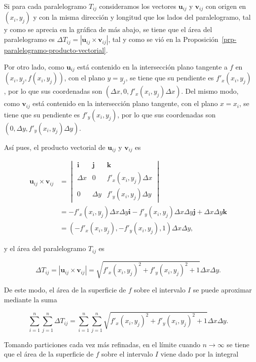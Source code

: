 \documentclass[
  a4paper,
]{scrreport}
\theoremstyle{definition}
\theoremstyle{definition}
\theoremstyle{definition}
\theoremstyle{plain}
\theoremstyle{plain}
\theoremstyle{plain}
\theoremstyle{remark}
\begin{document}
Si para cada paralelogramo \(T_{ij}\) consideramos los vectores
\(\mathbf{u}_{ij}\) y \(\mathbf{v}_{ij}\) con origen en \((x_i, y_j)\) y
con la misma dirección y longitud que los lados del paralelogramo, tal y
como se aprecia en la gráfica de más abajo, se tiene que el área del
paralelogramo es
\(\Delta T_{ij} = |\mathbf{u}_{ij}\times\mathbf{v}_{ij}|\), tal y como
se vió en la Proposición~\ref{prp-paralelogramo-producto-vectorial}.

Por otro lado, como \(\mathbf{u}_{ij}\) está contenido en la
intersección plano tangente a \(f\) en \((x_i,y_j,f(x_i,y_j))\), con el
plano \(y=y_j\), se tiene que su pendiente es \(f'_x(x_i,y_j)\), por lo
que sus coordenadas son \((\Delta x, 0, f'_x(x_i,y_j)\Delta x)\). Del
mismo modo, como \(\mathbf{v}_{ij}\) está contenido en la intersección
plano tangente, con el plano \(x=x_i\), se tiene que su pendiente es
\(f'_y(x_i,y_j)\), por lo que sus coordenadas son
\((0, \Delta y, f'_y(x_i,y_j)\Delta y)\).

Así pues, el producto vectorial de \(\mathbf{u}_{ij}\) y
\(\mathbf{v}_{ij}\) es

\begin{align*}
\mathbf{u}_{ij}\times\mathbf{v}_{ij} 
&= 
\begin{vmatrix}
\mathbf{i} & \mathbf{j} & \mathbf{k} \\
\Delta x & 0 & f'_x(x_i,y_j)\Delta x \\
0 & \Delta y & f'_y(x_i,y_j)\Delta y
\end{vmatrix} \\
&= -f'_x(x_i,y_j)\Delta x\Delta y \mathbf{i} -f'_y(x_i,y_j)\Delta x\Delta y \mathbf{j} + \Delta x\Delta y \mathbf{k} \\
&= (-f'_x(x_i,y_j), -f'_y(x_i,y_j), 1)\Delta x\Delta y,
\end{align*}

y el área del paralelogramo \(T_{ij}\) es

\[
\Delta T_{ij} 
= |\mathbf{u}_{ij}\times\mathbf{v}_{ij}| 
= \sqrt{f'_x(x_i,y_j)^2 + f'_y(x_i,y_j)^2 + 1}\Delta x\Delta y.
\]

De este modo, el área de la superficie de \(f\) sobre el intervalo \(I\)
se puede aproximar mediante la suma

\[
\sum_{i=1}^n\sum_{j=1}^n \Delta T_{ij} 
= \sum_{i=1}^n\sum_{j=1}^n \sqrt{f'_x(x_i,y_j)^2 + f'_y(x_i,y_j)^2 + 1}\Delta x\Delta y.
\]

Tomando particiones cada vez más refinadas, en el límite cuando
\(n\to \infty\) se tiene que el área de la superficie de \(f\) sobre el
intervalo \(I\) viene dado por la integral
\end{document}
